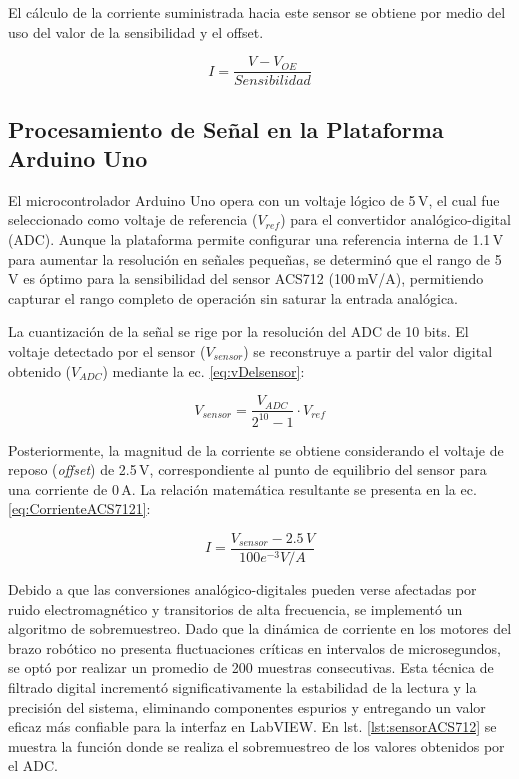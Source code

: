 El cálculo de la corriente suministrada hacia este sensor se obtiene por medio del uso del valor de la sensibilidad y el offset. 

\begin{equation}
	I=\frac{V-V_{OE}}{Sensibilidad}
	\label{eq:CorrienteACS712}
\end{equation}

\subsection{Procesamiento de Señal en la Plataforma Arduino Uno}

El microcontrolador Arduino Uno opera con un voltaje lógico de 5\,V, el cual fue seleccionado como voltaje de referencia ($V_{ref}$) para el convertidor analógico-digital (ADC). Aunque la plataforma permite configurar una referencia interna de 1.1\,V para aumentar la resolución en señales pequeñas, se determinó que el rango de 5\,V es óptimo para la sensibilidad del sensor ACS712 (100\,mV/A), permitiendo capturar el rango completo de operación sin saturar la entrada analógica.

La cuantización de la señal se rige por la resolución del ADC de 10 bits. El voltaje detectado por el sensor ($V_{sensor}$) se reconstruye a partir del valor digital obtenido ($V_{ADC}$) mediante la ec. \ref{eq:vDelsensor}:

\begin{equation}
	V_{sensor} = \frac{V_{ADC}}{2^{10} - 1} \cdot V_{ref}
	\label{eq:vDelsensor}
\end{equation}

Posteriormente, la magnitud de la corriente se obtiene considerando el voltaje de reposo (\textit{offset}) de 2.5\,V, correspondiente al punto de equilibrio del sensor para una corriente de 0\,A. La relación matemática resultante se presenta en la ec. \ref{eq:CorrienteACS7121}:

\begin{equation}
	I = \frac{V_{sensor} - 2.5\,V}{100e^{-3} V/A}
	\label{eq:CorrienteACS7121}
\end{equation}

Debido a que las conversiones analógico-digitales pueden verse afectadas por ruido electromagnético y transitorios de alta frecuencia, se implementó un algoritmo de sobremuestreo. Dado que la dinámica de corriente en los motores del brazo robótico no presenta fluctuaciones críticas en intervalos de microsegundos, se optó por realizar un promedio de 200 muestras consecutivas. Esta técnica de filtrado digital incrementó significativamente la estabilidad de la lectura y la precisión del sistema, eliminando componentes espurios y entregando un valor eficaz más confiable para la interfaz en LabVIEW. En lst. \ref{lst:sensorACS712} se muestra la función donde se realiza el sobremuestreo de los valores obtenidos por el ADC. 

